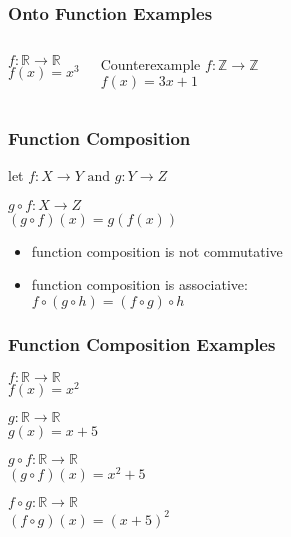 \documentclass[dvipsnames]{beamer}
\begin{document}
\begin{frame}
  \frametitle{Onto Function Examples}

  \begin{columns}
    \begin{example}
      $f: \mathbb{R} \rightarrow \mathbb{R}$\\
      $f(x) = x^3$
    \end{example}

    \pause
    \begin{block}{Counterexample}
      $f: \mathbb{Z} \rightarrow \mathbb{Z}$\\
      $f(x) = 3x + 1$
    \end{block}
  \end{columns}
\end{frame}

\begin{frame}
  \frametitle{Function Composition}

  \begin{definition}
    let $f: X \rightarrow Y \mbox{  and   } g: Y \rightarrow Z$

    \medskip
    $g \circ f: X \rightarrow Z$\\
    $(g \circ f)(x) = g(f(x))$
  \end{definition}

  \pause
  \begin{itemize}
    \item function composition is not commutative
    \item function composition is associative:\\
      $f \circ (g \circ h) = (f \circ g) \circ h$
  \end{itemize}
\end{frame}

\begin{frame}
  \frametitle{Function Composition Examples}

  \begin{example}[commutativity]
    $f: \mathbb{R} \rightarrow \mathbb{R}$\\
    $f(x) = x^2$

    \medskip
    $g: \mathbb{R} \rightarrow \mathbb{R}$\\
    $g(x) = x + 5$

    \pause
    \bigskip
    $g \circ f: \mathbb{R} \rightarrow \mathbb{R}$\\
    $(g \circ f)(x) = x^2 + 5$

    \pause
    \medskip
    $f \circ g: \mathbb{R} \rightarrow \mathbb{R}$\\
    $(f \circ g)(x) = (x + 5)^2$
  \end{example}
\end{frame}
\end{document}

